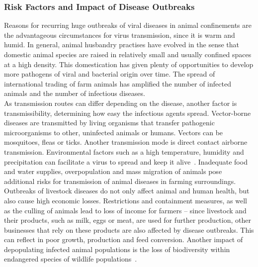 \subsubsection*{Risk Factors and Impact of Disease Outbreaks}
Reasons for recurring huge outbreaks of viral diseases in animal confinements are the advantageous circumstances for virus transmission, since it is warm and humid. In general, animal husbandry practises have evolved in the sense that domestic animal species are raised in relatively small and usually confined spaces at a high density. This domestication has given plenty of opportunities to develop more pathogens of viral and bacterial origin over time. The spread of international trading of farm animals has amplified the number of infected animals and the number of infectious diseases. \\
As transmission routes can differ depending on the disease, another factor is transmissibility, determining how easy the infectious agents spread. Vector-borne diseases are transmitted by living organisms that transfer pathogenic microorganisms to other, uninfected animals or humans. Vectors can be mosquitoes, fleas or ticks. %
Another transmission mode is direct contact airborne transmission. Environmental factors such as a high temperature, humidity and precipitation can facilitate a virus to spread and keep it alive~\cite{eccles2002explanation}. Inadequate food and water supplies, overpopulation and mass migration of animals pose additional risks for transmission of animal diseases in farming surroundings. \\
Outbreaks of livestock diseases do not only affect animal and human health, but also cause high economic losses. Restrictions and containment measures, as well as the culling of animals lead to loss of income for farmers -- since livestock and their products, such as milk, eggs or meat, are used for further production, other businesses that rely on these products are also affected by disease outbreaks. %
This can reflect in poor growth, production and feed conversion. Another impact of depopulating infected animal populations is the loss of biodiversity within endangered species of wildlife populations~\cite{lacroix2014non, morand2020emerging, reid2010global}.%

